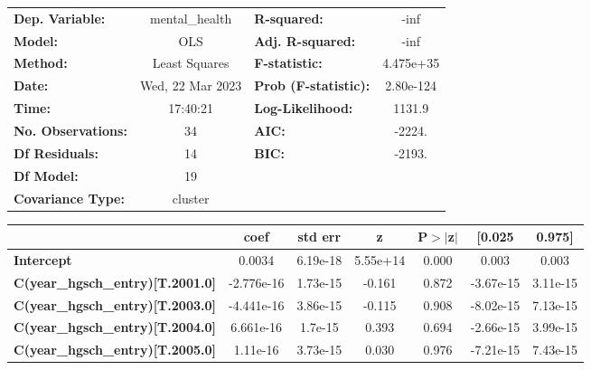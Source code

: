 \begin{center}
\begin{tabular}{lclc}
\toprule
\textbf{Dep. Variable:}                  &  mental\_health  & \textbf{  R-squared:         } &      -inf   \\
\textbf{Model:}                          &       OLS        & \textbf{  Adj. R-squared:    } &      -inf   \\
\textbf{Method:}                         &  Least Squares   & \textbf{  F-statistic:       } & 4.475e+35   \\
\textbf{Date:}                           & Wed, 22 Mar 2023 & \textbf{  Prob (F-statistic):} & 2.80e-124   \\
\textbf{Time:}                           &     17:40:21     & \textbf{  Log-Likelihood:    } &    1131.9   \\
\textbf{No. Observations:}               &          34      & \textbf{  AIC:               } &    -2224.   \\
\textbf{Df Residuals:}                   &          14      & \textbf{  BIC:               } &    -2193.   \\
\textbf{Df Model:}                       &          19      & \textbf{                     } &             \\
\textbf{Covariance Type:}                &     cluster      & \textbf{                     } &             \\
\bottomrule
\end{tabular}
\begin{tabular}{lcccccc}
                                         & \textbf{coef} & \textbf{std err} & \textbf{z} & \textbf{P$> |$z$|$} & \textbf{[0.025} & \textbf{0.975]}  \\
\midrule
\textbf{Intercept}                       &       0.0034  &     6.19e-18     &  5.55e+14  &         0.000        &        0.003    &        0.003     \\
\textbf{C(year\_hgsch\_entry)[T.2001.0]} &   -2.776e-16  &     1.73e-15     &    -0.161  &         0.872        &    -3.67e-15    &     3.11e-15     \\
\textbf{C(year\_hgsch\_entry)[T.2003.0]} &   -4.441e-16  &     3.86e-15     &    -0.115  &         0.908        &    -8.02e-15    &     7.13e-15     \\
\textbf{C(year\_hgsch\_entry)[T.2004.0]} &    6.661e-16  &      1.7e-15     &     0.393  &         0.694        &    -2.66e-15    &     3.99e-15     \\
\textbf{C(year\_hgsch\_entry)[T.2005.0]} &     1.11e-16  &     3.73e-15     &     0.030  &         0.976        &    -7.21e-15    &     7.43e-15     \\

\end{tabular}
\end{center}

